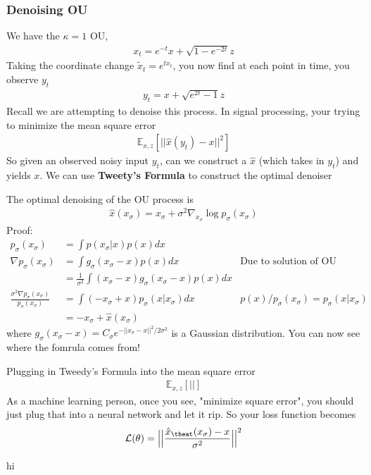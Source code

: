 \subsubsection{Denoising OU}
We have the $\kappa=1$ OU, 
\begin{align}
	x_t = e^{-t} x + \sqrt{1 - e^{-2 t}} z
\end{align}
Taking the coordinate change $\tilde x_t = e^{t x_t}$, you now find at each point in time, you observe $y_t$
\begin{align}
	y_t = x + \sqrt{e^{2t} - 1}z
\end{align}
Recall we are attempting to denoise this process. In signal processing, your trying to minimize the mean square error 
\begin{align}
	\mathbb E_{x,z} [||\hat x(y_t) - x||^2]
\end{align}
So given an observed noisy input $y_t$, can we construct a $\hat x$ (which takes in $y_t$) and yields $x$. We can use \textbf{Tweety's Formula} to construct the optimal denoiser
\begin{theorem}
	The optimal denoising of the OU process is
	\begin{align}
		\hat x (x_\sigma) = x_\sigma + \sigma^2 \nabla_{x_\sigma} \log p_\sigma (x_\sigma)
	\end{align}
	Proof:
	\begin{align}
		p_\sigma (x_\sigma) & = \int p(x_\sigma | x) p(x) dx\\
		\nabla p_\sigma (x_\sigma) & = \int g_\sigma (x_\sigma - x) p(x) dx & \text{Due to solution of OU}\\
		& = \frac{1}{\sigma^2} \int  (x_\sigma - x) g_\sigma(x_\sigma - x) p(x) dx\\
		\frac{\sigma^2 \nabla p_\sigma(x_\sigma)}{p_\sigma(x_\sigma)} &  = \int (-x_\sigma + x) p_\sigma(x | x_\sigma) dx & p(x) / p_\sigma(x_\sigma) = p_\sigma(x | x_\sigma)\\
		& = - x_\sigma + \hat x(x_\sigma) 
	\end{align}
	where $g_\sigma(x_\sigma -x ) = C_\sigma e^{-||x_\sigma - x||^2 / 2\sigma^2}$ is a Gaussian distribution. You can now see where the fomrula comes from!
\end{theorem}
Plugging in Tweedy's Formula into the mean square error
\begin{align}
	\mathbb E_{x,z} [|| ]
\end{align}
As a machine learning person, once you see, "minimize square error", you should just plug that into a neural network and let it rip. So your loss function becomes
\begin{align}
	\mathcal L(\theta) =  \Big|\Big|\frac{\hat x_\theat(x_\sigma) - x}{\sigma^2}\Big|\Big|^2
\end{align}




























\newpage
hi


